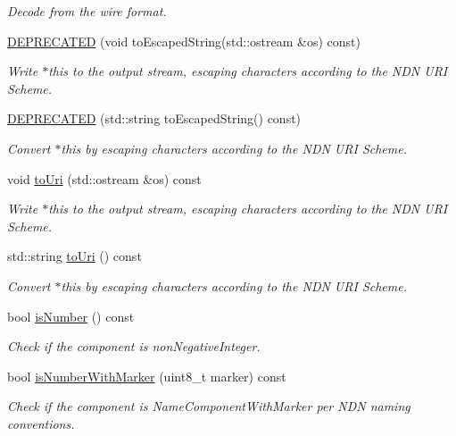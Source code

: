 \begin{DoxyCompactItemize}
\begin{DoxyCompactList}\small\item\em Decode from the wire format. \end{DoxyCompactList}\item 
\hyperlink{classndn_1_1name_1_1Component_ae0a7d2ceecae01153319e5185eb7238d}{D\+E\+P\+R\+E\+C\+A\+T\+ED} (void to\+Escaped\+String(std\+::ostream \&os) const)
\begin{DoxyCompactList}\small\item\em Write $\ast$this to the output stream, escaping characters according to the N\+DN U\+RI Scheme. \end{DoxyCompactList}\item 
\hyperlink{classndn_1_1name_1_1Component_a5eacacf66c30c34b34ebf8735d1e08df}{D\+E\+P\+R\+E\+C\+A\+T\+ED} (std\+::string to\+Escaped\+String() const)
\begin{DoxyCompactList}\small\item\em Convert $\ast$this by escaping characters according to the N\+DN U\+RI Scheme. \end{DoxyCompactList}\item 
void \hyperlink{classndn_1_1name_1_1Component_a822f3053b5ddc45e19cb35fd0ae5fb29}{to\+Uri} (std\+::ostream \&os) const
\begin{DoxyCompactList}\small\item\em Write $\ast$this to the output stream, escaping characters according to the N\+DN U\+RI Scheme. \end{DoxyCompactList}\item 
std\+::string \hyperlink{classndn_1_1name_1_1Component_a23eb559728bd6a72edb5732d5546ac6c}{to\+Uri} () const
\begin{DoxyCompactList}\small\item\em Convert $\ast$this by escaping characters according to the N\+DN U\+RI Scheme. \end{DoxyCompactList}\item 
bool \hyperlink{classndn_1_1name_1_1Component_ab108a2c2dab47ca90894ae2a1783f9db}{is\+Number} () const
\begin{DoxyCompactList}\small\item\em Check if the component is non\+Negative\+Integer. \end{DoxyCompactList}\item 
bool \hyperlink{classndn_1_1name_1_1Component_aacab577718d5d19e500b55fc495975aa}{is\+Number\+With\+Marker} (uint8\+\_\+t marker) const
\begin{DoxyCompactList}\small\item\em Check if the component is Name\+Component\+With\+Marker per N\+DN naming conventions. \end{DoxyCompactList}\item 

\end{DoxyCompactItemize}

